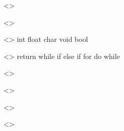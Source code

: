 \begin{obeliskgrammar}
<\typeUNDERSCORE{}> \gramdef{} \basicUNDERSCOREtype*{}
  \grambar \noUNDERSCOREmultidim*{} \LSBRACK*{} \RSBRACK*{}
  \grambar \noUNDERSCOREmultidim*{} \LSBRACK*{} \TUNDERSCOREINT*{}
           \RSBRACK*{}
  \grambar \REF*{} \basicUNDERSCOREtype*{}

<\noUNDERSCOREmultidim{}> \gramdef{} \basicUNDERSCOREtype*{}
  \grambar \REF*{} \basicUNDERSCOREtype*{}

<\basicUNDERSCOREtype{}> \gramdef{} int
  \grambar float
  \grambar char
  \grambar void
  \grambar bool

<\stmt{}> \gramdef{} return \gramopt{\expr*{}} \SEMICOLON*{}
  \grambar \gramopt{\expr*{}} \SEMICOLON*{}
  \grambar \block*{}
  \grambar while \LRBRACK*{} \expr*{} \RRBRACK*{} \stmt*{}
  \grambar if \LRBRACK*{} \expr*{} \RRBRACK*{} \stmt*{} else \stmt*{}
  \grambar if \LRBRACK*{} \expr*{} \RRBRACK*{} \stmt*{}
  \grambar for \LRBRACK*{} \gramopt{\expr*{}} \SEMICOLON*{}
           \gramopt{\expr*{}} \SEMICOLON*{} \gramopt{\expr*{}} \RRBRACK*{}
           \stmt*{}
  \grambar do \stmt*{} while \LRBRACK*{} \expr*{} \RRBRACK*{} \SEMICOLON*{}

<\expr{}> \gramdef{} \TUNDERSCOREINT*{}
  \grambar \TUNDERSCOREFLOAT*{}
  \grambar \TUNDERSCORECHAR*{}
  \grambar \TUNDERSCOREBOOL*{}
  \grambar \LRBRACK*{} \expr*{} \RRBRACK*{}
  \grambar \REF*{} \lUNDERSCOREvalue*{}
  \grambar \lUNDERSCOREvalue*{} \ASSIGN*{} \expr*{}
  \grambar \lUNDERSCOREvalue*{} \abbrUNDERSCOREassign*{} \expr*{}
  \grambar \NOT*{} \expr*{}
  \grambar \ID*{} \LRBRACK*{} \gramseplist{\COMMA*{}}{\expr*{}} \RRBRACK*{}
  \grambar \lUNDERSCOREvalue*{}
  \grambar \MINUS*{} \expr*{}
  \grambar \expr*{} \binUNDERSCOREop*{} \expr*{}
  \grambar \lUNDERSCOREvalue*{} \PLUSPLUS*{}
  \grambar \lUNDERSCOREvalue*{} \MINUSMINUS*{}
  \grambar \PLUSPLUS*{} \lUNDERSCOREvalue*{}
  \grambar \MINUSMINUS*{} \expr*{}

<\lUNDERSCOREvalue{}> \gramdef{} \ID*{}
  \grambar \ID*{} \LSBRACK*{} \expr*{} \RSBRACK*{}

<\binUNDERSCOREop{}> \gramdef{} \PLUS*{}
  \grambar \MINUS*{}
  \grambar \TIMES*{}
  \grambar \MOD*{}
  \grambar \DIV*{}
  \grambar \AND*{}
  \grambar \OR*{}
  \grambar \LESS*{}
  \grambar \GREATER*{}
  \grambar \LEQ*{}
  \grambar \GEQ*{}
  \grambar \EQUAL*{}
  \grambar \NEQ*{}

<\abbrUNDERSCOREassign{}> \gramdef{} \PASSIGN*{}
  \grambar \MINASSIGN*{}
  \grambar \TASSIGN*{}
  \grambar \DASSIGN*{}
  \grambar \MODASSIGN*{}

\end{obeliskgrammar}
